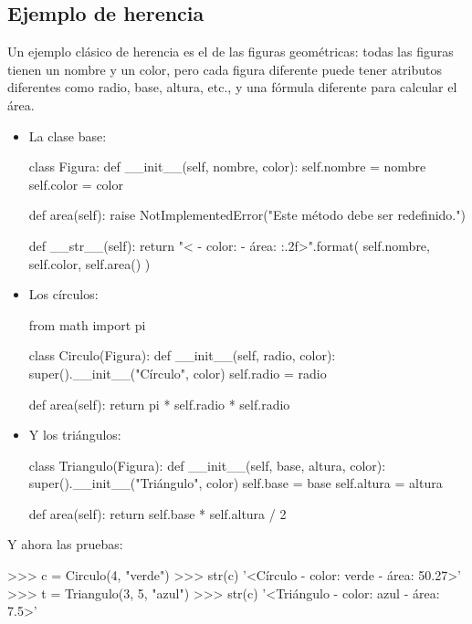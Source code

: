 \subsection*{Ejemplo de herencia}

Un ejemplo clásico de herencia es el de las figuras geométricas: todas las
figuras tienen un nombre y un color, pero cada figura diferente puede tener
atributos diferentes como radio, base, altura, etc., y una fórmula diferente
para calcular el área.

\begin{itemize}
\item La clase base:

\begin{codigo-python-sn}
class Figura:
    def __init__(self, nombre, color):
        self.nombre = nombre
        self.color = color

    def area(self):
        raise NotImplementedError("Este método debe ser redefinido.")

    def __str__(self):
        return "<{} - color: {} - área: {:.2f}>".format(
            self.nombre, self.color, self.area()
        )
\end{codigo-python-sn}

\item Los círculos:

\begin{codigo-python-sn}
from math import pi

class Circulo(Figura):
    def __init__(self, radio, color):
        super().__init__("Círculo", color)
        self.radio = radio

    def area(self):
        return pi * self.radio * self.radio
\end{codigo-python-sn}

\item Y los triángulos:

\begin{codigo-python-sn}
class Triangulo(Figura):
    def __init__(self, base, altura, color):
        super().__init__("Triángulo", color)
        self.base = base
        self.altura = altura

    def area(self):
        return self.base * self.altura / 2
\end{codigo-python-sn}

\end{itemize}

Y ahora las pruebas:

\begin{codigo-python-sn}
>>> c = Circulo(4, "verde")
>>> str(c)
'<Círculo - color: verde - área: 50.27>'
>>> t = Triangulo(3, 5, "azul")
>>> str(c)
'<Triángulo - color: azul - área: 7.5>'
\end{codigo-python-sn}


